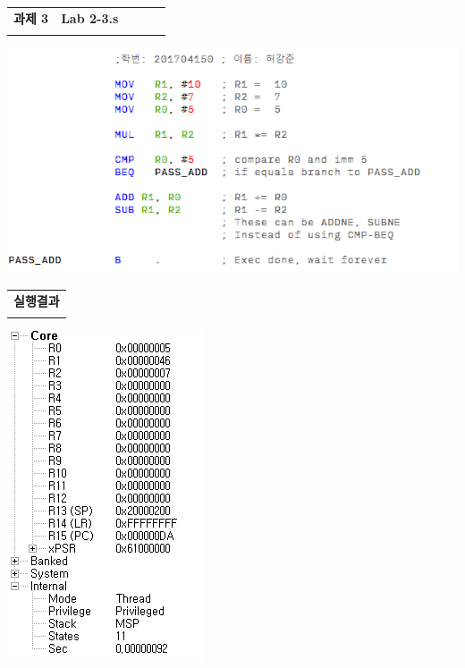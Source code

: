 \documentclass{article}
\begin{document}
\newpage

\begin{table}[htbp]
    \begin{tabularx}{\linewidth}{@{\extracolsep{\fill} }
        >{\centering}p{0.3\linewidth}
        p{0.7\linewidth} }
    \Xhline{3\arrayrulewidth}
    \textbf{과제 3} & \textbf{Lab 2-3.s} \\ \Xhline{3\arrayrulewidth}
    \end{tabularx}
\end{table}

\begin{center}
\includegraphics{result/lab2-3-src.PNG}
\end{center}

\begin{table}[htbp]
    \begin{tabularx}{\textwidth}{@{\extracolsep{\fill} }
        p{\linewidth}}
    \Xhline{3\arrayrulewidth}
    \textbf{실행결과} \\ \Xhline{3\arrayrulewidth}
    \end{tabularx}
\end{table}

\begin{center}
\includegraphics{result/lab2-3-reg.PNG}
\end{center}
\end{document}
